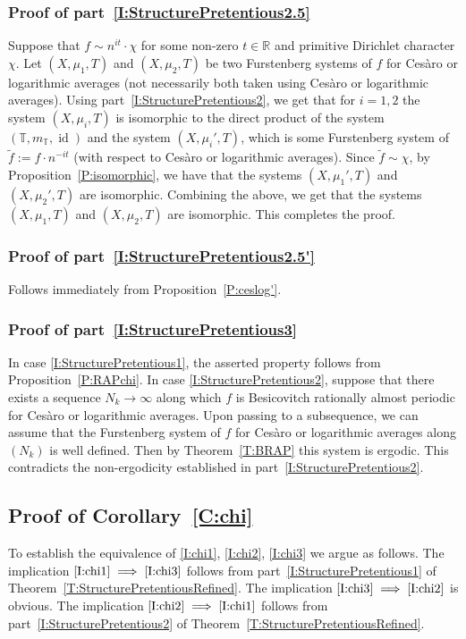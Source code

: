 \documentclass[11pt]{amsart}
\theoremstyle{definition}
\newcommand{\R}{{\mathbb R}}
\newcommand{\T}{{\mathbb T}}
\DeclareMathOperator{\id}{id}
\begin{document}
\subsubsection{Proof of part~\eqref{I:StructurePretentious2.5}}
Suppose that  $f\sim n^{it}\cdot \chi$ for some non-zero $t\in \R$ and primitive  Dirichlet character $\chi$. Let  $(X,\mu_1,T)$ and $(X,\mu_2,T)$ be two Furstenberg systems of $f$ for Ces\`aro or logarithmic averages (not necessarily both taken using Ces\`aro or logarithmic averages).  Using  part~\eqref{I:StructurePretentious2},
we get that
for $i=1,2$ the system $(X,\mu_i,T)$ is isomorphic
to the direct product of the system $(\T,m_\T,\id)$
and the system $(X,\mu_i',T)$, which is
some Furstenberg system of $\tilde{f}:=f\cdot n^{-it}$ (with respect to Ces\`aro or logarithmic averages). Since  $\tilde{f}\sim \chi$, by Proposition~\ref{P:isomorphic},
 we have  that
the systems  $(X,\mu_1',T)$ and $(X,\mu_2',T)$ are isomorphic. Combining the above, we get that the systems $(X,\mu_1,T)$ and $(X,\mu_2,T)$ are isomorphic.
This completes the proof.


\subsubsection{Proof of part~\eqref{I:StructurePretentious2.5'}}  Follows immediately from   Proposition~\ref{P:ceslog'}.

\subsubsection{Proof of part~\eqref{I:StructurePretentious3}}  In case \eqref{I:StructurePretentious1},  the asserted property  follows from  Proposition~\ref{P:RAPchi}.
In case \eqref{I:StructurePretentious2}, suppose that there exists a sequence $N_k\to\infty$ along which $f$ is Besicovitch rationally almost periodic for Ces\`aro or logarithmic averages. Upon passing to a subsequence, we can assume that the Furstenberg system of $f$ for Ces\`aro or logarithmic averages along $(N_k)$ is well defined. Then by Theorem~\ref{T:BRAP} this system is ergodic. This contradicts the non-ergodicity  established in  part~\eqref{I:StructurePretentious2}.

\subsection{Proof of Corollary~\ref{C:chi}}\label{SS:chi}
To establish the equivalence of \eqref{I:chi1}, \eqref{I:chi2}, \eqref{I:chi3} we argue as follows.
The implication $\eqref{I:chi1}\implies  \eqref{I:chi3}$ follows from part~\eqref{I:StructurePretentious1} of Theorem~\ref{T:StructurePretentiousRefined}.
The implication $\eqref{I:chi3}\implies  \eqref{I:chi2}$ is obvious.
The implication $\eqref{I:chi2}\implies  \eqref{I:chi1}$ follows from part~\eqref{I:StructurePretentious2} of Theorem~\ref{T:StructurePretentiousRefined}.
\end{document}
